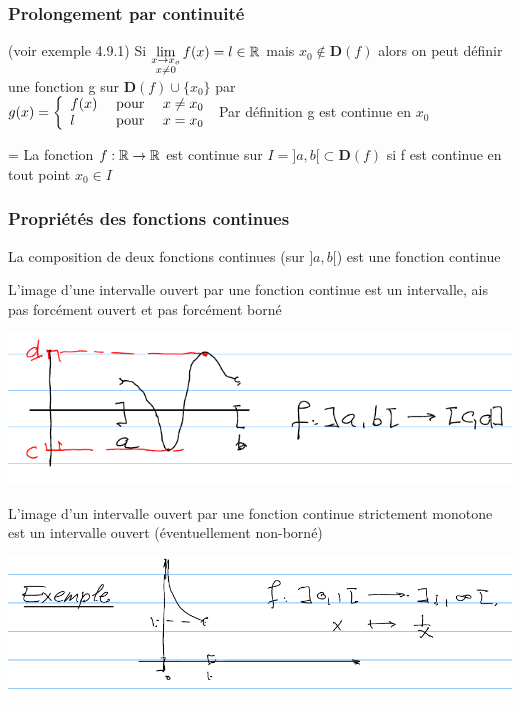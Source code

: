 \documentclass[12pt,a4paper]{article}
\begin{document}
{\subsubsection*{Prolongement par continuité}(voir exemple 4.9.1)
Si $\lim\limits_{\substack{x \to x_o \\ x \neq 0}} f(x) = l \in  \mathbb{R}$ mais $x_0 \not \in \mathbf{D}(f)$ alors on peut définir une fonction g sur $\mathbf{D}(f) \cup \{x_0\}$ par\\
$g(x) = \left\{
\begin{array}{lll}
f(x) & \mbox{ pour } & x \neq x_0\\
l & \mbox{ pour }& x= x_0
\end{array}
\right.$
Par définition g est continue en $x_0$
\begin{boite}=  
\Definition La fonction $f : \mathbb{R} \to \mathbb{R}$ est continue sur $I = ]a,b[ \subset \mathbf{D}(f)$ si f est continue en tout point $x_0 \in I$
\end{boite}
\subsubsection{Propriétés des fonctions continues}
\begin{boite}
\Remarque La composition de deux fonctions continues (sur $]a,b[$) est une fonction continue
\end{boite}
\begin{boite}
\Remarque L'image d'une intervalle ouvert par une fonction continue est un intervalle, ais pas forcément ouvert et pas forcément borné
\end{boite}
\includegraphics[scale=0.5]{Illustrations_Analyse/interv_ouvert}
\begin{boite}
\Remarque L'image d'un intervalle ouvert par une fonction continue strictement monotone est un intervalle ouvert (éventuellement non-borné)
\end{boite}
\includegraphics[scale=0.5]{Illustrations_Analyse/interv_mono}
}
\end{document}
